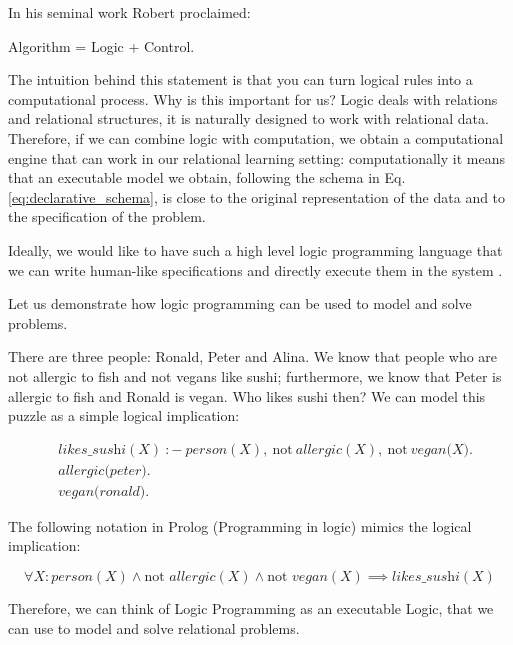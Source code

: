 In his seminal work Robert \textcite{kowalski} proclaimed:
\begin{center}
  Algorithm = Logic + Control.
\end{center}

The intuition behind this statement is that
you can turn logical rules into a computational process. 
Why is this important for us? Logic deals with
relations and relational structures, it is naturally designed to
work with relational data. Therefore, if we can combine logic
with computation, we obtain a computational engine that can work in
\pubrev
our relational learning setting: computationally it means that an
executable model we obtain, following the schema in Eq. \ref{eq:declarative_schema}, is close to the original representation of the data and to the specification of the problem.

Ideally, we would like to have such a high level logic programming language that we can write human-like specifications and directly execute them in the system \parencite{denecker}.
\pubrevend

Let us demonstrate how logic programming can be used to model and solve problems. 
\begin{example}
There are three people: Ronald, Peter and
Alina. We know that people who are not allergic to fish and not vegans like sushi; 
furthermore, we know that Peter is allergic to fish and Ronald is
    vegan. 
Who likes sushi then? We can model this puzzle as a
simple logical implication:

\begin{equation*}
    \begin{aligned}
& \textit{likes\_sushi}(X)~{:}{-}~\textit{person}(X),~\text{not}~
        \textit{allergic}(X), ~\text{not}~\textit{vegan(X)}. \\
&       \textit{allergic(peter)}. \\
&       \textit{vegan(ronald)}.
    \end{aligned}
\end{equation*}

The following notation in Prolog (Programming in logic)
\parencite{birth_of_prolog} mimics the logical implication:

\begin{equation}\label{eq:sushi}
  \forall X: \textit{person}(X) \wedge \text{not }
    \textit{allergic}(X) \wedge \text{not } \textit{vegan}(X)
  \implies \textit{likes\_sushi}(X)
\end{equation}
\end{example}
Therefore, we can think of Logic Programming as an executable Logic, that
we can use to model and solve relational problems.

